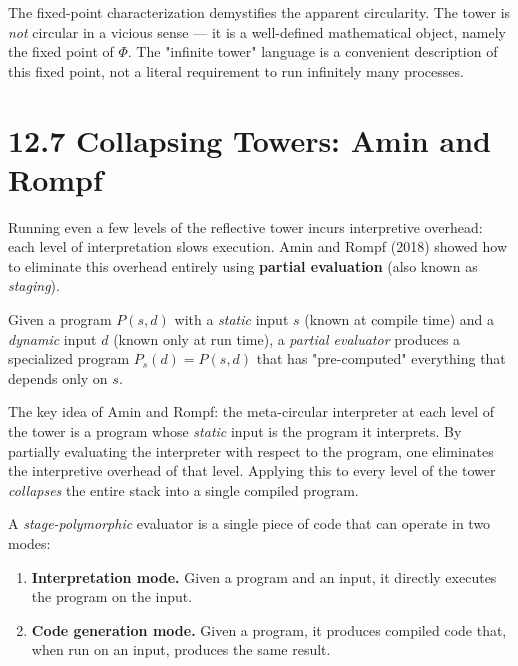 \begin{remark}
The fixed-point characterization demystifies the apparent circularity. The tower is \textit{not} circular in a vicious sense --- it is a well-defined mathematical object, namely the fixed point of $\Phi$. The "infinite tower" language is a convenient description of this fixed point, not a literal requirement to run infinitely many processes.
\end{remark}

\section{12.7 Collapsing Towers: Amin and Rompf}

Running even a few levels of the reflective tower incurs interpretive overhead: each level of interpretation slows execution. Amin and Rompf (2018) showed how to eliminate this overhead entirely using \textbf{partial evaluation} (also known as \textit{staging}).

\begin{definition}
Given a program $P(s, d)$ with a \textit{static} input $s$ (known at compile time) and a \textit{dynamic} input $d$ (known only at run time), a \textit{partial evaluator} produces a specialized program $P_s(d) = P(s, d)$ that has "pre-computed" everything that depends only on $s$.

The key idea of Amin and Rompf: the meta-circular interpreter at each level of the tower is a program whose \textit{static} input is the program it interprets. By partially evaluating the interpreter with respect to the program, one eliminates the interpretive overhead of that level. Applying this to every level of the tower \textit{collapses} the entire stack into a single compiled program.
\end{definition}

\begin{definition}
A \textit{stage-polymorphic} evaluator is a single piece of code that can operate in two modes:
\end{definition}

\begin{enumerate}
  \item \textbf{Interpretation mode.} Given a program and an input, it directly executes the program on the input.
  \item \textbf{Code generation mode.} Given a program, it produces compiled code that, when run on an input, produces the same result.
\end{enumerate}

